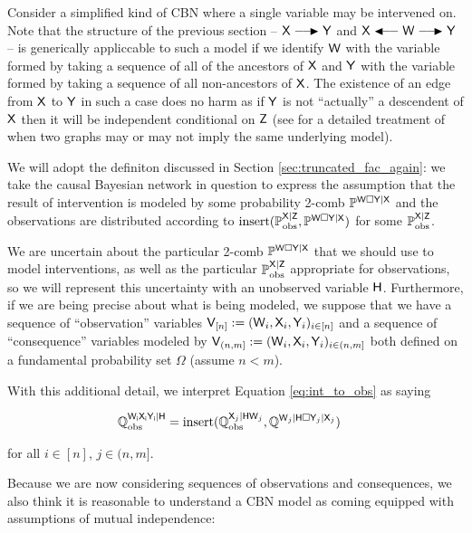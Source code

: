Consider a simplified kind of CBN where a single variable may be intervened on. Note that the structure of the previous section -- $\RV{X}\longrightarrowRHD \RV{Y}$ and $\RV{X}\longleftarrowRHD \RV{W} \longrightarrowRHD \RV{Y}$ -- is generically appliccable to such a model if we identify $\mathsf{W}$ with the variable formed by taking a sequence of all of the ancestors of $\mathsf{X}$ and $\mathsf{Y}$ with the variable formed by taking a sequence of all non-ancestors of $\mathsf{X}$. The existence of an edge from $\mathsf{X}$ to $\mathsf{Y}$ in such a case does no harm as if $\mathsf{Y}$ is not ``actually'' a descendent of $\mathsf{X}$ then it will be independent conditional on $\mathsf{Z}$ (see \citet{peters_structural_2015} for a detailed treatment of when two graphs may or may not imply the same underlying model).

We will adopt the definiton discussed in Section \ref{sec:truncated_fac_again}: we take the causal Bayesian network in question to express the assumption that the result of intervention is modeled by some probability 2-comb $\mathbb{P}^{\mathsf{W}\square \mathsf{Y}|\mathsf{X}}$ and the observations are distributed according to $\text{insert}(\mathbb{P}_{\text{obs}}^{\mathsf{X}|\mathsf{Z}},\mathbb{P}^{\mathsf{W}\square\mathsf{Y}|\mathsf{X}})$ for some $\mathbb{P}_{\text{obs}}^{\mathsf{X}|\mathsf{Z}}$.

We are uncertain about the particular 2-comb $\mathbb{P}^{\mathsf{W}\square \mathsf{Y}|\mathsf{X}}$ that we should use to model interventions, as well as the particular $\mathbb{P}_{\text{obs}}^{\mathsf{X}|\mathsf{Z}}$ appropriate for observations, so we will represent this uncertainty with an unobserved variable $\mathsf{H}$. Furthermore, if we are being precise about what is being modeled, we suppose that we have a sequence of ``observation'' variables $\mathsf{V}_{[n]}:=(\mathsf{W}_i,\mathsf{X}_i,\mathsf{Y}_i)_{i\in [n]}$ and a sequence of ``consequence'' variables modeled by $\mathsf{V}_{(n,m]}:=(\mathsf{W}_i,\mathsf{X}_i,\mathsf{Y}_i)_{i\in (n,m]}$ both defined on a fundamental probability set $\Omega$ (assume $n<m$). 

With this additional detail, we interpret Equation \ref{eq:int_to_obs} as saying

\begin{align}
    \mathbb{Q}_{\text{obs}}^{\mathsf{W_iX_iY_i}|\mathsf{H}} &= \text{insert}(\mathbb{Q}_{\text{obs}}^{\mathsf{X}_{j}|\mathsf{HW}_{j}},\mathbb{Q}^{\mathsf{W}_{j}|\mathsf{H}\square\mathsf{Y}_{j}|\mathsf{X}_{j}})
\end{align}

for all $i\in[n]$, $j\in (n,m]$.

Because we are now considering sequences of observations and consequences, we also think it is reasonable to understand a CBN model as coming equipped with assumptions of mutual independence:


